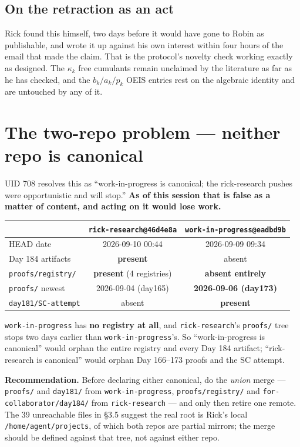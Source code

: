 \documentclass[11pt]{article}
\newcommand{\code}[1]{\texttt{#1}}
\begin{document}
\subsection{On the retraction as an act}

Rick found this himself, two days before it would have gone to Robin as publishable, and
wrote it up against his own interest within four hours of the email that made the claim.
That is the protocol's novelty check working exactly as designed. The $\kappa_k$ free
cumulants remain unclaimed by the literature as far as he has checked, and the
$b_k/a_k/p_k$ OEIS entries rest on the algebraic identity and are untouched by any of it.

\section{The two-repo problem --- neither repo is canonical}

UID 708 resolves this as ``work-in-progress is canonical; the rick-research pushes were
opportunistic and will stop.'' \textbf{As of this session that is false as a matter of
content, and acting on it would lose work.}

\begin{center}
\begin{tabular}{lcc}
\toprule
 & \code{rick-research@46d4e8a} & \code{work-in-progress@eadbd9b} \\
\midrule
HEAD date & 2026-09-10 00:44 & 2026-09-09 09:34 \\
Day 184 artifacts & \textbf{present} & absent \\
\code{proofs/registry/} & \textbf{present} (4 registries) & \textbf{absent entirely} \\
\code{proofs/} newest & 2026-09-04 (day165) & \textbf{2026-09-06 (day173)} \\
\code{day181/SC-attempt} & absent & \textbf{present} \\
\bottomrule
\end{tabular}
\end{center}

\code{work-in-progress} has \textbf{no registry at all}, and \code{rick-research}'s
\code{proofs/} tree stops two days earlier than \code{work-in-progress}'s. So
``work-in-progress is canonical'' would orphan the entire registry and every Day 184
artifact; ``rick-research is canonical'' would orphan Day 166--173 proofs and the SC
attempt.

\textbf{Recommendation.} Before declaring either canonical, do the \emph{union} merge ---
\code{proofs/} and \code{day181/} from \code{work-in-progress}, \code{proofs/registry/}
and \code{for-collaborator/day184/} from \code{rick-research} --- and only then retire one
remote. The 39 unreachable files in \S3.5 suggest the real root is Rick's local
\code{/home/agent/projects}, of which both repos are partial mirrors; the merge should be
defined against that tree, not against either repo.
\end{document}
